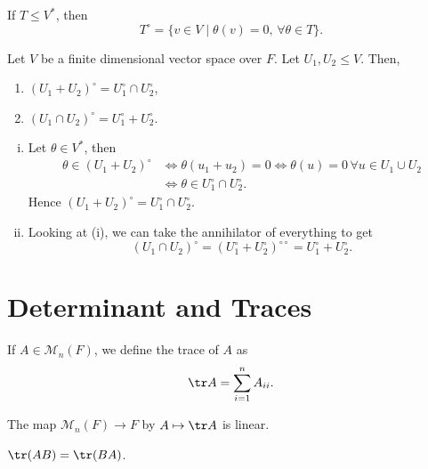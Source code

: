 \documentclass[12pt]{article}
\begin{document}
\begin{remark}
	If $T \leq V^{\ast}$, then
	\[
		T^{\circ} = \{v \in V \mid \theta(v) = 0, \, \forall \theta \in T\}
	.\]
\end{remark}

\begin{lemma}
	Let $V$ be a finite dimensional vector space over $F$. Let $U_1, U_2 \leq V$. Then,
	\begin{enumerate}[\normalfont(i)]
		\item $(U_1 + U_2)^{\circ} = U_1^{\circ} \cap U_2^{\circ}$,
		\item $(U_1 \cap U_2)^{\circ} = U_1^{\circ} + U_2^{\circ}$.
	\end{enumerate}
\end{lemma}

\begin{proofbox}
\begin{enumerate}[(i)]
	\item Let $\theta \in V^{\ast}$, then
		\begin{align*}
			\theta \in (U_1 + U_2)^{\circ} &\iff \theta(u_1 + u_2) = 0 \iff \theta(u) = 0 \, \forall u \in U_1 \cup U_2 \\
						       &\iff \theta \in U_1^{\circ} \cap U_2^{\circ}.
		\end{align*}
		Hence $(U_1 + U_2)^{\circ} = U_1^{\circ} \cap U_2^{\circ}$.
	\item Looking at (i), we can take the annihilator of everything to get
		\[
			(U_1 \cap U_2)^{\circ} = (U_1^{\circ} + U_2^{\circ})^{\circ \circ} = U_1^{\circ} + U_2^{\circ}
		.\]
\end{enumerate}
\end{proofbox}

\newpage

\section{Determinant and Traces}%
\label{sec:determinant_and_traces}

\begin{definition}
	If $A \in \mathcal{M}_{n}(F)$, we define the trace of $A$ as
	\[
	\tr A = \sum_{i = 1}^{n} A_{ii}
	.\]
\end{definition}

\begin{remark}
	The map $\mathcal{M}_n(F) \to F$ by $A \mapsto \tr A$ is linear.
\end{remark}

\begin{lemma}
	$\tr (AB) = \tr (BA)$.
\end{lemma}
\end{document}
